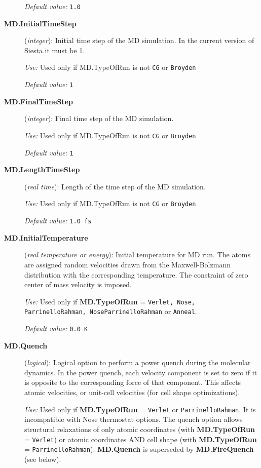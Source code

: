 \documentclass[11pt]{article}
\begin{document}
\begin{description}
{\it Default value:} {\tt 1.0}

   
\item[{\bf MD.InitialTimeStep}] ({\it integer}): 
Initial time step of the MD simulation.
In the current version of {\sc Siesta} it must be 1.

{\it Use:} Used only if MD.TypeOfRun is not {\tt CG} or {\tt Broyden}
    
{\it Default value:} {\tt 1}

\item[{\bf MD.FinalTimeStep}] ({\it integer}): 
Final time step of the MD simulation.

{\it Use:} Used only if MD.TypeOfRun is not {\tt CG} or {\tt Broyden}
    
{\it Default value:} {\tt 1}

\item[{\bf MD.LengthTimeStep}] ({\it real time}): 
Length of the time step of the MD simulation.

{\it Use:} Used only if MD.TypeOfRun is not {\tt CG} or {\tt Broyden}
    
{\it Default value:} {\tt 1.0 fs}

\item[{\bf MD.InitialTemperature}] ({\it real temperature or energy}): 
Initial temperature for MD run. The atoms are assigned random 
velocities drawn from the Maxwell-Bolzmann distribution with the
corresponding temperature. The constraint of zero center of
mass velocity is imposed.

{\it Use:} Used only if {\bf MD.TypeOfRun} = {\tt Verlet, Nose, 
ParrinelloRahman, NoseParrinelloRahman}
or {\tt Anneal}.

{\it Default value:} {\tt 0.0 K}

\item[{\bf MD.Quench}] ({\it logical}): 
Logical option to perform a power quench during the molecular dynamics. 
In the power quench, each velocity component is set to
zero if it is opposite to the corresponding force
of that component. This affects atomic velocities,
or unit-cell velocities (for cell shape optimizations).

{\it Use:} Used only if {\bf MD.TypeOfRun} = {\tt Verlet} or 
{\tt ParrinelloRahman}.
It is incompatible with Nose thermostat options.
The quench option allows structural relaxations of
only atomic coordinates (with {\bf MD.TypeOfRun} = {\tt Verlet})
or atomic coordinates AND cell shape 
(with {\bf MD.TypeOfRun} = {\tt ParrinelloRahman}).
{\bf MD.Quench} is superseded by {\bf MD.FireQuench} (see below).


\end{description}
\end{document}
